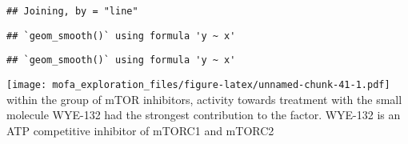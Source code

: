 \documentclass[
]{article}
\newenvironment{Shaded}{\begin{snugshade}}{\end{snugshade}}
\newcommand{\DataTypeTok}[1]{\textcolor[rgb]{0.13,0.29,0.53}{#1}}
\newcommand{\DecValTok}[1]{\textcolor[rgb]{0.00,0.00,0.81}{#1}}
\newcommand{\KeywordTok}[1]{\textcolor[rgb]{0.13,0.29,0.53}{\textbf{#1}}}
\newcommand{\NormalTok}[1]{#1}
\newcommand{\OperatorTok}[1]{\textcolor[rgb]{0.81,0.36,0.00}{\textbf{#1}}}
\newcommand{\OtherTok}[1]{\textcolor[rgb]{0.56,0.35,0.01}{#1}}
\newcommand{\StringTok}[1]{\textcolor[rgb]{0.31,0.60,0.02}{#1}}
\begin{document}
\begin{verbatim}
## Joining, by = "line"
\end{verbatim}

\begin{Shaded}
\end{Shaded}

\begin{verbatim}
## `geom_smooth()` using formula 'y ~ x'
\end{verbatim}

\begin{verbatim}
## `geom_smooth()` using formula 'y ~ x'
\end{verbatim}

\texttt{[image: mofa\_exploration\_files/figure-latex/unnamed-chunk-41-1.pdf]}
within the group of mTOR inhibitors, activity towards treatment with the
small molecule WYE-132 had the strongest contribution to the factor.
WYE-132 is an ATP competitive inhibitor of mTORC1 and mTORC2
\end{document}
